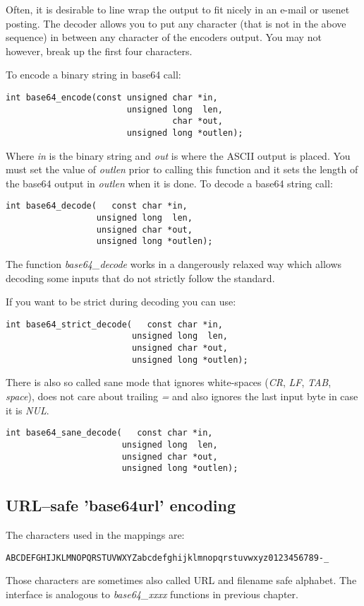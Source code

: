 \documentclass[synpaper]{book}
\begin{document}
Often, it is desirable to line wrap the output to fit nicely in an e-mail or usenet posting.  The decoder allows you to
put any character (that is not in the above sequence) in between any character of the encoders output.  You may not however,
break up the first four characters.

To encode a binary string in base64 call:
\begin{verbatim}
int base64_encode(const unsigned char *in,
                        unsigned long  len,
                                 char *out,
                        unsigned long *outlen);
\end{verbatim}
Where \textit{in} is the binary string and \textit{out} is where the ASCII output is placed.  You must set the value of \textit{outlen} prior
to calling this function and it sets the length of the base64 output in \textit{outlen} when it is done.  To decode a base64
string call:
\begin{verbatim}
int base64_decode(   const char *in,
                  unsigned long  len,
                  unsigned char *out,
                  unsigned long *outlen);
\end{verbatim}

The function \textit{base64\_decode} works in a dangerously relaxed way which allows decoding some inputs that do not strictly follow the standard.

If you want to be strict during decoding you can use:
\begin{verbatim}
int base64_strict_decode(   const char *in,
                         unsigned long  len,
                         unsigned char *out,
                         unsigned long *outlen);
\end{verbatim}

There is also so called sane mode that ignores white-spaces (\textit{CR}, \textit{LF}, \textit{TAB}, \textit{space}),
does not care about trailing \textit{=} and also ignores the last input byte in case it is \textit{NUL}.
\begin{verbatim}
int base64_sane_decode(   const char *in,
                       unsigned long  len,
                       unsigned char *out,
                       unsigned long *outlen);
\end{verbatim}

\subsection{URL--safe 'base64url' encoding}
The characters used in the mappings are:
\begin{verbatim}
ABCDEFGHIJKLMNOPQRSTUVWXYZabcdefghijklmnopqrstuvwxyz0123456789-_
\end{verbatim}
Those characters are sometimes also called URL and filename safe alphabet.
The interface is analogous to \textit{base64\_xxxx} functions in previous chapter.
\end{document}
